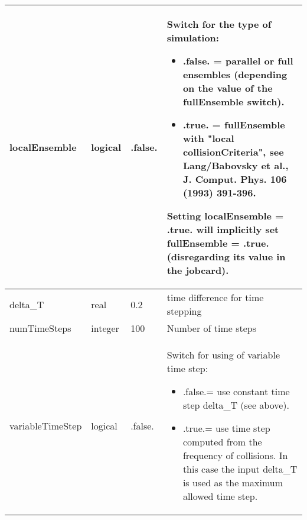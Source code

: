 \documentclass{article}
\begin{document}
\begin{longtable}{llll}
\midrule
localEnsemble & \begin{minipage}[t]{2cm}logical\end{minipage} & \begin{minipage}[t]{2cm}.false.\end{minipage} & \begin{minipage}[t]{12cm}Switch for the type of simulation:\begin{itemize}\leftmargin0em\itemindent0pt\item .false. = parallel or full ensembles (depending on the value of the fullEnsemble switch).\item .true. = fullEnsemble with "local collisionCriteria", see Lang/Babovsky et al., J. Comput. Phys. 106 (1993) 391-396.\end{itemize} Setting localEnsemble = .true. will implicitly set fullEnsemble = .true. (disregarding its value in the jobcard).\end{minipage}\\*
\midrule
delta\_T & \begin{minipage}[t]{2cm}real\end{minipage} & \begin{minipage}[t]{2cm}0.2\end{minipage} & \begin{minipage}[t]{12cm}time difference for time stepping\end{minipage}\\*
\midrule
numTimeSteps & \begin{minipage}[t]{2cm}integer\end{minipage} & \begin{minipage}[t]{2cm}100\end{minipage} & \begin{minipage}[t]{12cm}Number of time steps\end{minipage}\\*
\midrule
variableTimeStep & \begin{minipage}[t]{2cm}logical\end{minipage} & \begin{minipage}[t]{2cm}.false.\end{minipage} & \begin{minipage}[t]{12cm}Switch for using of variable time step:\begin{itemize}\leftmargin0em\itemindent0pt\item .false.= use constant time step delta\_T (see above).\item .true.= use time step computed from the frequency of collisions.   In this case the input delta\_T is used as the maximum   allowed time step.\end{itemize}\end{minipage}\\*

\end{longtable}
\end{document}

